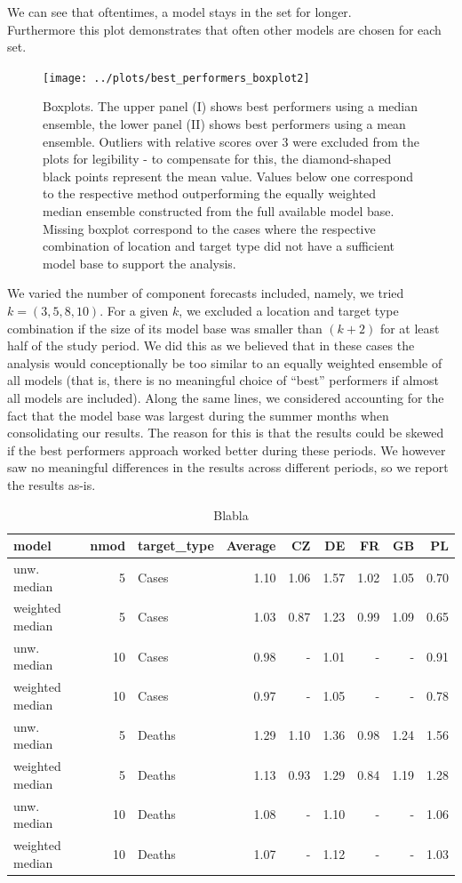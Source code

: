 We can see that oftentimes, a model stays in the set for longer.\\
Furthermore this plot demonstrates that often other models are chosen for each set.
\begin{figure}
\centering
\texttt{[image: ../plots/best\_performers\_boxplot2]}
\caption{Boxplots. The upper panel (I) shows best performers using a median ensemble, the lower panel (II) shows best performers using a mean ensemble. Outliers with relative scores over 3 were excluded from the plots for legibility - to compensate for this, the diamond-shaped black points represent the mean value. Values below one correspond to the respective method outperforming the equally weighted median ensemble constructed from the full available model base. Missing boxplot correspond to the cases where the respective combination of location and target type did not have a sufficient model base to support the analysis.}
\label{ref:best_perform_boxplot}
\end{figure}
We varied the number of component forecasts included, namely, we tried $k = (3,5,8,10)$. For a given $k$, we excluded a location and target type combination if the size of its model base was smaller than $(k+2)$ for at least half of the study period. We did this as we believed that in these cases the analysis would conceptionally be too similar to an equally weighted ensemble of all models (that is, there is no meaningful choice of ``best'' performers if almost all models are included). Along the same lines, we considered accounting for the fact that the model base was largest during the summer months when consolidating our results. The reason for this is that the results could be skewed if the best performers approach worked better during these periods. We however saw no meaningful differences in the results across different periods, so we report the results as-is. \\
\begin{table}[t]
\centering
\begin{tabular}{lrlrrrrrr}
\hline
model & nmod & target\_type & Average & CZ & DE & FR & GB & PL\\
\hline
unw. median & 5 & Cases & 1.10 & 1.06 & 1.57 & 1.02 & 1.05 & 0.70\\
weighted median & 5 & Cases & 1.03 & 0.87 & 1.23 & 0.99 & 1.09 & 0.65\\
unw. median & 10 & Cases & 0.98 & - & 1.01 & - & - & 0.91\\
weighted median & 10 & Cases & 0.97 & - & 1.05 & - & - & 0.78\\
unw. median & 5 & Deaths & 1.29 & 1.10 & 1.36 & 0.98 & 1.24 & 1.56\\
weighted median & 5 & Deaths & 1.13 & 0.93 & 1.29 & 0.84 & 1.19 & 1.28\\
unw. median & 10 & Deaths & 1.08 & - & 1.10 & - & - & 1.06\\
weighted median & 10 & Deaths & 1.07 & - & 1.12 & - & - & 1.03\\
\hline
\end{tabular}
\caption{Blabla}
\label{tab:rel_wis_best_performers}
\end{table}
